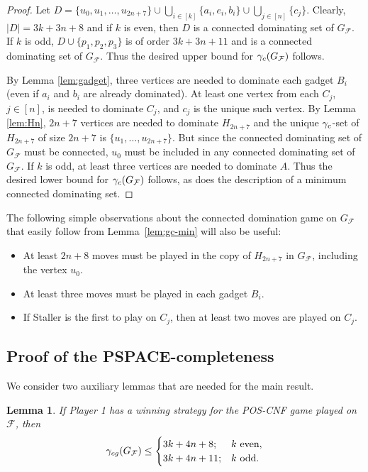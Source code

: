 \documentclass[12pt]{article}
\newtheorem{lemma}[theorem]{Lemma}
\newcommand{\gcg}{\gamma_{\rm cg}}
\newcommand{\gc}{\gamma_{\rm c}}
\newcommand{\F}{\mathcal{F}}
\begin{document}
\begin{proof}
	Let $D = \{u_0, u_1, \ldots, u_{2n+7}\} \cup \bigcup_{i\in [k]} \{a_i, e_i, b_i\} \cup \bigcup_{j \in [n]} \{c_j\}$. Clearly, $|D| = 3k+3n+8$ and if $k$ is even, then $D$ is a connected dominating set of $G_{\F}$. If $k$ is odd, $D \cup \{p_1, p_2, p_3\}$ is of order $3k+3n+11$ and is a connected dominating set of $G_{\F}$. Thus the desired upper bound for $\gc(G_\F)$ follows.
	
	By Lemma \ref{lem:gadget}, three vertices are needed to dominate each gadget $B_i$ (even if $a_i$ and $b_i$ are already dominated). At least one vertex from each $C_j$, $j \in [n]$, is needed to dominate $C_j$, and $c_j$ is the unique such vertex. By Lemma \ref{lem:Hn}, $2n+7$ vertices are needed to dominate $H_{2n+7}$ and the unique $\gc$-set of $H_{2n+7}$ of size $2n+7$ is $\{u_1, \ldots, u_{2n+7}\}$. But since the connected dominating set of $G_\F$ must be connected, $u_0$ must be included in any connected dominating set of $G_\F$. If $k$ is odd, at least three vertices are needed to dominate $A$. Thus the desired lower bound for $\gc(G_\F)$ follows, as does the description of a minimum connected dominating set.
\end{proof}

The following simple observations about the connected domination game on $G_{\F}$ that easily follow from Lemma~\ref{lem:gc-min} will also be useful:
\begin{itemize}
	\item At least $2n+8$ moves must be played in the copy of $H_{2n+7}$ in $G_\F$, including the vertex $u_0$.
	\item At least three moves must be played in each gadget $B_i$.
	\item If Staller is the first to play on $C_j$, then at least two moves are played on $C_j$.
\end{itemize}


\subsection{Proof of the PSPACE-completeness}
\label{sec:proof}

We consider two auxiliary lemmas that are needed for the main result.

\begin{lemma}
	\label{lem:p1-wins}
	If Player 1 has a winning strategy for the POS-CNF game played on $\F$, then $$\gcg(G_\F) \leq \begin{cases}
		3k + 4n + 8; & k \text{ even},\\
		3k + 4n + 11; & k \text{ odd}.
	\end{cases}$$
\end{lemma}
\end{document}

